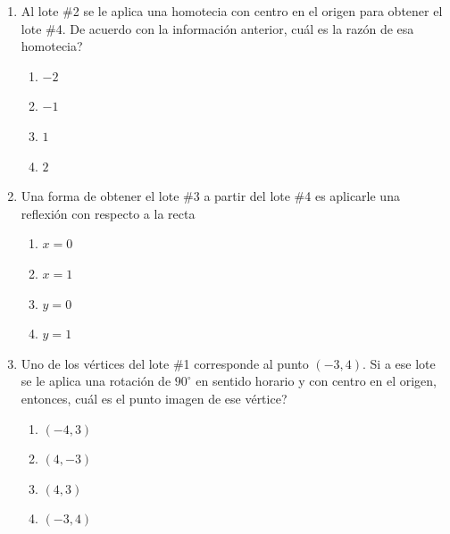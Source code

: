 \documentclass[12pt]{article}
\newcommand{\opcion}[2]{\item $#2$}
\begin{document}
\begin{enumerate}[label=\textbf{\arabic*.}, start=21, itemsep=0.35cm]

\item
Al lote \#2 se le aplica una homotecia con centro en el origen para obtener el lote \#4. De acuerdo con la informaci\'on anterior, \textquestiondown cu\'al es la raz\'on de esa homotecia?

\begin{enumerate}[label=\Alph*), itemsep=0pt, topsep=2pt, parsep=0pt]
  \opcion{A}{-2}
  \opcion{B}{-1}
  \opcion{C}{1}
  \opcion{D}{2}
\end{enumerate}

\item
Una forma de obtener el lote \#3 a partir del lote \#4 es aplicarle una reflexi\'on con respecto a la recta

\begin{enumerate}[label=\Alph*), itemsep=0pt, topsep=2pt, parsep=0pt]
  \opcion{A}{x=0}
  \opcion{B}{x=1}
  \opcion{C}{y=0}
  \opcion{D}{y=1}
\end{enumerate}

\item
Uno de los v\'ertices del lote \#1 corresponde al punto $(-3,4)$. Si a ese lote se le aplica una rotaci\'on de $90^\circ$ en sentido horario y con centro en el origen, entonces, \textquestiondown cu\'al es el punto imagen de ese v\'ertice?

\begin{enumerate}[label=\Alph*), itemsep=0pt, topsep=2pt, parsep=0pt]
  \opcion{A}{(-4,3)}
  \opcion{B}{(4,-3)}
  \opcion{C}{(4,3)}
  \opcion{D}{(-3,4)}
\end{enumerate}

\end{enumerate}

\newpage
\end{document}

